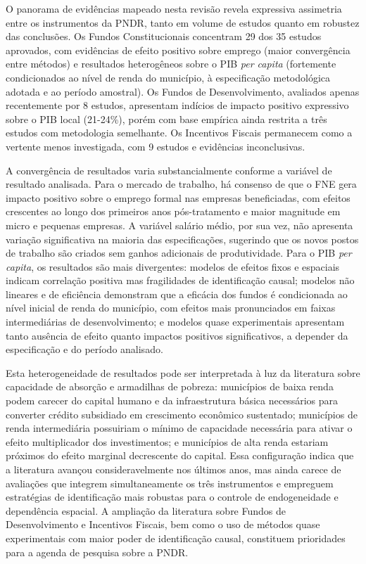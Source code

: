 O panorama de evidências mapeado nesta revisão revela expressiva assimetria entre os instrumentos da PNDR, tanto em volume de estudos quanto em robustez das conclusões. Os Fundos Constitucionais concentram 29 dos 35 estudos aprovados, com evidências de efeito positivo sobre emprego (maior convergência entre métodos) e resultados heterogêneos sobre o PIB \textit{per capita} (fortemente condicionados ao nível de renda do município, à especificação metodológica adotada e ao período amostral). Os Fundos de Desenvolvimento, avaliados apenas recentemente por 8 estudos, apresentam indícios de impacto positivo expressivo sobre o PIB local (21-24\%), porém com base empírica ainda restrita a três estudos com metodologia semelhante. Os Incentivos Fiscais permanecem como a vertente menos investigada, com 9 estudos e evidências inconclusivas.

A convergência de resultados varia substancialmente conforme a variável de resultado analisada. Para o mercado de trabalho, há consenso de que o FNE gera impacto positivo sobre o emprego formal nas empresas beneficiadas, com efeitos crescentes ao longo dos primeiros anos pós-tratamento e maior magnitude em micro e pequenas empresas. A variável salário médio, por sua vez, não apresenta variação significativa na maioria das especificações, sugerindo que os novos postos de trabalho são criados sem ganhos adicionais de produtividade. Para o PIB \textit{per capita}, os resultados são mais divergentes: modelos de efeitos fixos e espaciais indicam correlação positiva mas fragilidades de identificação causal; modelos não lineares e de eficiência demonstram que a eficácia dos fundos é condicionada ao nível inicial de renda do município, com efeitos mais pronunciados em faixas intermediárias de desenvolvimento; e modelos quase experimentais apresentam tanto ausência de efeito quanto impactos positivos significativos, a depender da especificação e do período analisado.

Esta heterogeneidade de resultados pode ser interpretada à luz da literatura sobre capacidade de absorção e armadilhas de pobreza: municípios de baixa renda podem carecer do capital humano e da infraestrutura básica necessários para converter crédito subsidiado em crescimento econômico sustentado; municípios de renda intermediária possuiriam o mínimo de capacidade necessária para ativar o efeito multiplicador dos investimentos; e municípios de alta renda estariam próximos do efeito marginal decrescente do capital. Essa configuração indica que a literatura avançou consideravelmente nos últimos anos, mas ainda carece de avaliações que integrem simultaneamente os três instrumentos e empreguem estratégias de identificação mais robustas para o controle de endogeneidade e dependência espacial. A ampliação da literatura sobre Fundos de Desenvolvimento e Incentivos Fiscais, bem como o uso de métodos quase experimentais com maior poder de identificação causal, constituem prioridades para a agenda de pesquisa sobre a PNDR.
